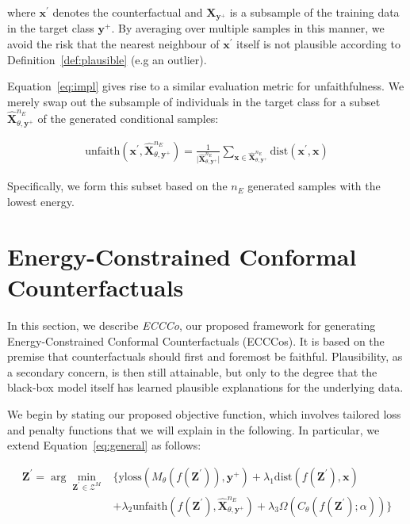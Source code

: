 \documentclass{article}
\begin{document}
where $\mathbf{x}^{\prime}$ denotes the counterfactual and $\mathbf{X}_{\mathbf{y}^+}$ is a subsample of the training data in the target class $\mathbf{y}^+$. By averaging over multiple samples in this manner, we avoid the risk that the nearest neighbour of $\mathbf{x}^{\prime}$ itself is not plausible according to Definition~\ref{def:plausible} (e.g an outlier).

Equation~\ref{eq:impl} gives rise to a similar evaluation metric for unfaithfulness. We merely swap out the subsample of individuals in the target class for a subset $\hat{\mathbf{X}}^{n_E}_{\theta,\mathbf{y}^+}$ of the generated conditional samples:

\begin{equation}\label{eq:faith}
  \begin{aligned}
    \text{unfaith}(\mathbf{x}^{\prime},\hat{\mathbf{X}}^{n_E}_{\theta,\mathbf{y}^+}) = \frac{1}{\lvert \hat{\mathbf{X}}^{n_E}_{\theta,\mathbf{y}^+}\rvert} \sum_{\mathbf{x} \in \hat{\mathbf{X}}^{n_E}_{\theta,\mathbf{y}^+}} \text{dist}(\mathbf{x}^{\prime},\mathbf{x})
  \end{aligned}
\end{equation}

Specifically, we form this subset based on the $n_E$ generated samples with the lowest energy. 

\section{Energy-Constrained Conformal Counterfactuals}\label{meth}

In this section, we describe \textit{ECCCo}, our proposed framework for generating Energy-Constrained Conformal Counterfactuals (ECCCos). It is based on the premise that counterfactuals should first and foremost be faithful. Plausibility, as a secondary concern, is then still attainable, but only to the degree that the black-box model itself has learned plausible explanations for the underlying data. 

We begin by stating our proposed objective function, which involves tailored loss and penalty functions that we will explain in the following. In particular, we extend Equation~\ref{eq:general} as follows:

\begin{equation} \label{eq:eccco}
  \begin{aligned}
  \mathbf{Z}^\prime= \arg \min_{\mathbf{Z}^\prime \in \mathcal{Z}^M}  &\{  {\text{yloss}(M_{\theta}(f(\mathbf{Z}^\prime)),\mathbf{y}^+)}+ \lambda_{1} {\text{dist}(f(\mathbf{Z}^\prime),\mathbf{x}) } \\
  &+ \lambda_2 \text{unfaith}(f(\mathbf{Z}^\prime),\hat{\mathbf{X}}^{n_E}_{\theta,\mathbf{y}^+}) + \lambda_3 \Omega(C_{\theta}(f(\mathbf{Z}^\prime);\alpha)) \} 
  \end{aligned} 
\end{equation}
\end{document}
